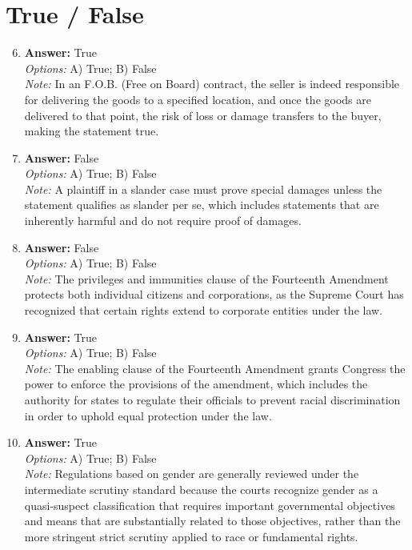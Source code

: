 \documentclass[12pt]{article}
\begin{document}
\section*{True / False}
\begin{enumerate}[label=\arabic*.]
\setcounter{enumi}{5}
\item \textbf{Answer:} True
\\ \textit{Options:} A) True; B) False
\\ \textit{Note:} In an F.O.B. (Free on Board) contract, the seller is indeed responsible for delivering the goods to a specified location, and once the goods are delivered to that point, the risk of loss or damage transfers to the buyer, making the statement true.
\item \textbf{Answer:} False
\\ \textit{Options:} A) True; B) False
\\ \textit{Note:} A plaintiff in a slander case must prove special damages unless the statement qualifies as slander per se, which includes statements that are inherently harmful and do not require proof of damages.
\item \textbf{Answer:} False
\\ \textit{Options:} A) True; B) False
\\ \textit{Note:} The privileges and immunities clause of the Fourteenth Amendment protects both individual citizens and corporations, as the Supreme Court has recognized that certain rights extend to corporate entities under the law.
\item \textbf{Answer:} True
\\ \textit{Options:} A) True; B) False
\\ \textit{Note:} The enabling clause of the Fourteenth Amendment grants Congress the power to enforce the provisions of the amendment, which includes the authority for states to regulate their officials to prevent racial discrimination in order to uphold equal protection under the law.
\item \textbf{Answer:} True
\\ \textit{Options:} A) True; B) False
\\ \textit{Note:} Regulations based on gender are generally reviewed under the intermediate scrutiny standard because the courts recognize gender as a quasi-suspect classification that requires important governmental objectives and means that are substantially related to those objectives, rather than the more stringent strict scrutiny applied to race or fundamental rights.
\end{enumerate}
\end{document}
